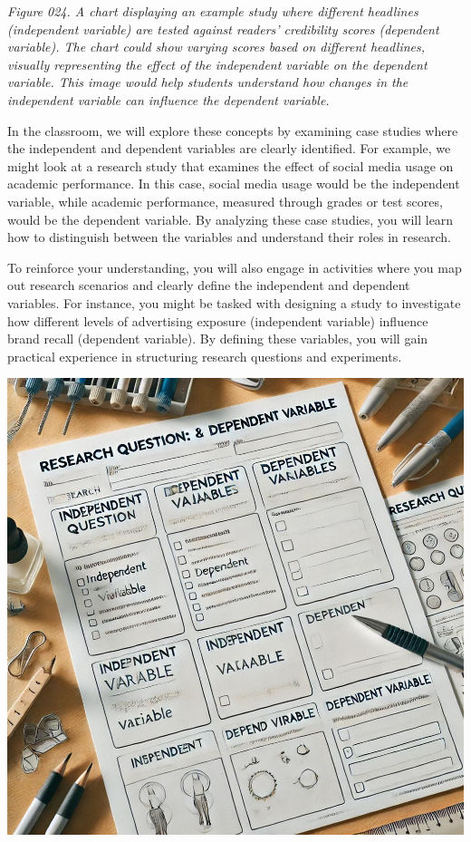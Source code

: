 \documentclass[
]{book}
\begin{document}
\emph{Figure 024. A chart displaying an example study where different headlines (independent variable) are tested against readers' credibility scores (dependent variable). The chart could show varying scores based on different headlines, visually representing the effect of the independent variable on the dependent variable. This image would help students understand how changes in the independent variable can influence the dependent variable.}

In the classroom, we will explore these concepts by examining case studies where the independent and dependent variables are clearly identified. For example, we might look at a research study that examines the effect of social media usage on academic performance. In this case, social media usage would be the independent variable, while academic performance, measured through grades or test scores, would be the dependent variable. By analyzing these case studies, you will learn how to distinguish between the variables and understand their roles in research.

To reinforce your understanding, you will also engage in activities where you map out research scenarios and clearly define the independent and dependent variables. For instance, you might be tasked with designing a study to investigate how different levels of advertising exposure (independent variable) influence brand recall (dependent variable). By defining these variables, you will gain practical experience in structuring research questions and experiments.

\includegraphics[width=1\textwidth,height=\textheight]{images/fig025.jpg}
\end{document}
